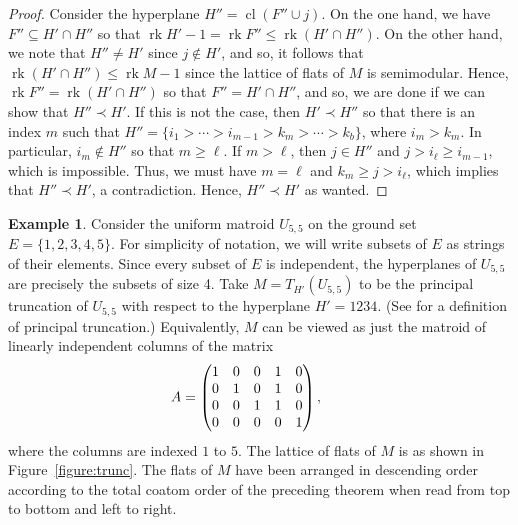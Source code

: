 \documentclass[11pt, reqno]{amsart}
\DeclareMathOperator{\cl}{cl}
\DeclareMathOperator{\rk}{rk}
\theoremstyle{definition}
\newtheorem{example}[thm]{Example}
\numberwithin{equation}{section}
\numberwithin{table}{section}
\begin{document}
\begin{spacing}{1.1}
\begin{proof}
Consider the hyperplane $H'' = \cl(F'' \cup j)$.  On the one hand, we have $F'' \subseteq H' \cap H''$ so that $\rk H' - 1 = \rk F'' \leq \rk(H' \cap H'')$.  On the other hand, we note that $H'' \neq H'$ since $j \notin H'$, and so, it follows that $\rk(H' \cap H'') \leq \rk M - 1$ since the lattice of flats of $M$ is semimodular.  Hence, $\rk F'' = \rk (H' \cap H'')$ so that $F'' = H' \cap H''$, and so, we are done if we can show that $H'' \prec H'$.  If this is not the case, then $H' \prec H''$ so that there is an index $m$ such that $H'' = \{i_1 > \cdots > i_{m-1} > k_m > \cdots > k_b \}$, where $i_m > k_m$. In particular, $i_m \notin H''$ so that $m \geq \ell$.  If $m > \ell$, then $j \in H''$ and $j > i_\ell \geq i_{m-1}$, which is impossible.  Thus, we must have $m = \ell$ and $k_m \geq j > i_\ell$, which implies that $H'' \prec H'$, a contradiction.  Hence, $H'' \prec H'$ as wanted.
\end{proof}

\begin{example}
Consider the uniform matroid $U_{5,5}$ on the ground set $E = \{1, 2, 3, 4, 5\}$.  For simplicity of notation, we will write subsets of $E$ as strings of their elements.  Since every subset of $E$ is independent, the hyperplanes of $U_{5, 5}$ are precisely the subsets of size 4.  Take $M = T_{H'}(U_{5, 5})$ to be the principal truncation of $U_{5, 5}$ with respect to the hyperplane $H' = 1234$.  (See \cite[p.279]{Oxl11} for a definition of principal truncation.) Equivalently, $M$ can be viewed as just the matroid of linearly independent columns of the matrix \vspace{0.5 em}
\[
\hspace{-2 em}
A = \begin{pmatrix} 
1 & 0 & 0 & 1 & 0 \\
0 & 1 & 0 & 1 & 0 \\
0 & 0 & 1 & 1 & 0 \\
0 & 0 & 0 & 0 & 1 
\end{pmatrix},
\vspace{0.5 em}
\]
where the columns are indexed $1$ to $5$.  The lattice of flats of $M$ is as shown in Figure~\ref{figure:trunc}. The flats of $M$ have been arranged in descending order according to the total coatom order of the preceding theorem when read from top to bottom and left to right.


\end{example}
\end{spacing}
\end{document}
